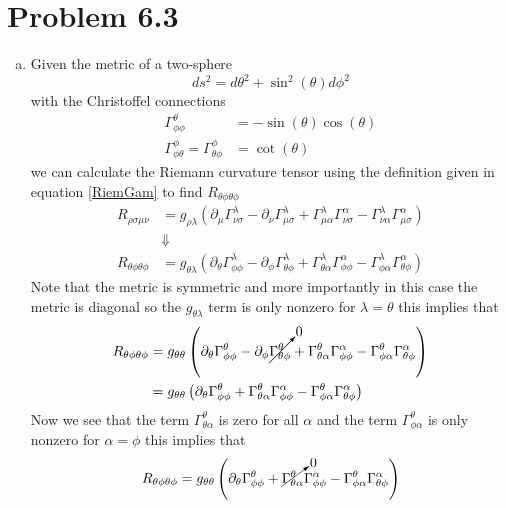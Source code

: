 \documentclass[11pt]{article}
\numberwithin{equation}{section}
\newcommand{\HWnum}{6}
\begin{document}
\section{Problem \HWnum.3}
\begin{enumerate}[(a)]
\item
Given the metric of a two-sphere
$$ds^2 = d\theta^2 + \sin^2(\theta)d\phi^2$$
with the Christoffel connections
\begin{align*}
\Gamma^{\theta}_{\phi\phi} &= -\sin(\theta)\cos(\theta)\\
\Gamma^{\phi}_{\phi\theta} = \Gamma^{\phi}_{\theta\phi} &= \cot(\theta)
\end{align*}
we can calculate the Riemann curvature tensor using the definition given in equation \ref{RiemGam} to find $R_{\theta\phi\theta\phi}$
\begin{align*}
R_{\rho\sigma\mu\nu} &= g_{\rho\lambda}\left(\partial_{\mu}\Gamma^{\lambda}_{\nu\sigma}-\partial_{\nu}\Gamma^{\lambda}_{\mu\sigma} +\Gamma^{\lambda}_{\mu\alpha}\Gamma^{\alpha}_{\nu\sigma} - \Gamma^{\lambda}_{\nu\alpha}\Gamma^{\alpha}_{\mu\sigma}\right)\\
&\Downarrow\\
R_{\theta\phi\theta\phi} &=  g_{\theta\lambda}\left(\partial_{\theta}\Gamma^{\lambda}_{\phi\phi}-\partial_{\phi}\Gamma^{\lambda}_{\theta\phi} +\Gamma^{\lambda}_{\theta\alpha}\Gamma^{\alpha}_{\phi\phi} - \Gamma^{\lambda}_{\phi\alpha}\Gamma^{\alpha}_{\theta\phi}\right)
\end{align*}
Note that the metric is symmetric and more importantly in this case the metric is diagonal so the $g_{\theta\lambda}$ term is only nonzero for $\lambda = \theta$ this implies that
\begin{align*}
R_{\theta\phi\theta\phi} &=  g_{\theta\theta}\left(\partial_{\theta}\Gamma^{\theta}_{\phi\phi}-\partial_{\phi}\cancelto{0}{\Gamma^{\theta}_{\theta\phi}} + \Gamma^{\theta}_{\theta\alpha}\Gamma^{\alpha}_{\phi\phi} - \Gamma^{\theta}_{\phi\alpha}\Gamma^{\alpha}_{\theta\phi}\right)\\
&=  g_{\theta\theta}\left(\partial_{\theta}\Gamma^{\theta}_{\phi\phi} + \Gamma^{\theta}_{\theta\alpha}\Gamma^{\alpha}_{\phi\phi} - \Gamma^{\theta}_{\phi\alpha}\Gamma^{\alpha}_{\theta\phi}\right)
\end{align*}
Now we see that the term $\Gamma^{\theta}_{\theta\alpha}$ is zero for all $\alpha$ and the term $\Gamma^{\theta}_{\phi\alpha}$ is only nonzero for $\alpha=\phi$ this implies that
\begin{align*}
R_{\theta\phi\theta\phi} &=  g_{\theta\theta}\left(\partial_{\theta}\Gamma^{\theta}_{\phi\phi} + \cancelto{0}{\Gamma^{\theta}_{\theta\alpha}}\Gamma^{\alpha}_{\phi\phi} - \Gamma^{\theta}_{\phi\alpha}\Gamma^{\alpha}_{\theta\phi}\right)\\

\end{align*}
\end{enumerate}
\end{document}
